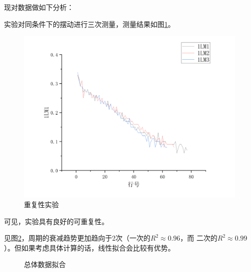 \documentclass[AutoFakeBold]{LZUThesis}
\begin{document}
现对数据做如下分析：

实验对同条件下的摆动进行三次测量，测量结果如图\ref{re}。
\begin{figure}[H]
    \centering
    \includegraphics[width=12cm]{figures/重复性.png}
    \caption{重复性实验}
    \label{re}
\end{figure}

可见，实验具有良好的可重复性。

见图\ref{总体数据拟合}，周期的衰减趋势更加趋向于2次（一次的$R^{2} \approx 0.96$，而
二次的$R^{2} \approx 0.99$）。但如果考虑具体计算的话，线性拟合会比较有优势。
\begin{figure}[H]
    \centering
    \caption{总体数据拟合}
    \label{总体数据拟合}
\end{figure}
\end{document}

